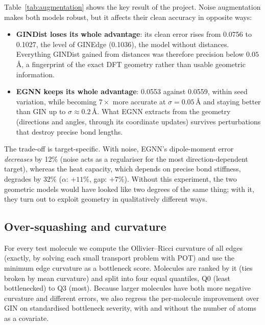 \documentclass[11pt,a4paper]{article}
\begin{document}
Table~\ref{tab:augmentation} shows the key result of the project. Noise augmentation makes
both models robust, but it affects their clean accuracy in opposite ways:
\begin{itemize}
  \item \textbf{GINDist loses its whole advantage}: its clean error rises from 0.0756 to
        0.1027, the level of GINEdge (0.1036), the model without distances. Everything
        GINDist gained from distances was therefore precision below $0.05$\,\AA{}, a
        fingerprint of the exact DFT geometry rather than usable geometric information.
  \item \textbf{EGNN keeps its whole advantage}: 0.0553 against 0.0559, within seed
        variation, while becoming $7\times$ more accurate at $\sigma=0.05$\,\AA{} and
        staying better than GIN up to $\sigma\approx0.2$\,\AA{}. What EGNN extracts from the
        geometry (directions and angles, through its coordinate updates) survives
        perturbations that destroy precise bond lengths.
\end{itemize}
The trade-off is target-specific. With noise, EGNN's dipole-moment error \emph{decreases}
by 12\% (noise acts as a regulariser for the most direction-dependent target), whereas the
heat capacity, which depends on precise bond stiffness, degrades by 32\% ($\alpha$: $+11\%$,
gap: $+7\%$). Without this experiment, the two geometric models would have looked like two
degrees of the same thing; with it, they turn out to exploit geometry in qualitatively
different ways.

\subsection{Over-squashing and curvature}\label{sec:curvature}

For every test molecule we compute the Ollivier--Ricci curvature of all edges (exactly, by
solving each small transport problem with POT) and use the minimum edge curvature as a
bottleneck score. Molecules are ranked by it (ties broken by mean curvature) and split into
four equal quantiles, Q0 (least bottlenecked) to Q3 (most). Because larger molecules have both
more negative curvature and different errors, we also regress the per-molecule improvement over
GIN on standardised bottleneck severity, with and without the number of atoms as a covariate.
\end{document}
